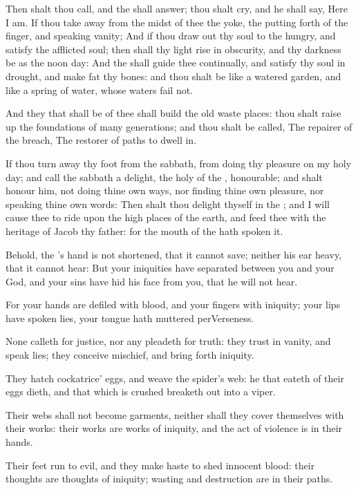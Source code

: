 \Verse Then shalt thou call, and the \LORD shall answer; thou shalt cry, and he shall say, Here I am. If thou take away from the midst of thee the yoke, the putting forth of the finger, and speaking vanity; \Verse And if thou draw out thy soul to the hungry, and satisfy the afflicted soul; then shall thy light rise in obscurity, and thy darkness be as the noon day: \Verse And the \LORD shall guide thee continually, and satisfy thy soul in drought, and make fat thy bones: and thou shalt be like a watered garden, and like a spring of water, whose waters fail not.

\Verse And they that shall be of thee shall build the old waste places: thou shalt raise up the foundations of many generations; and thou shalt be called, The repairer of the breach, The restorer of paths to dwell in.

\Verse If thou turn away thy foot from the sabbath, from doing thy pleasure on my holy day; and call the sabbath a delight, the holy of the \LORD, honourable; and shalt honour him, not doing thine own ways, nor finding thine own pleasure, nor speaking thine own words: \Verse Then shalt thou delight thyself in the \LORD; and I will cause thee to ride upon the high places of the earth, and feed thee with the heritage of Jacob thy father: for the mouth of the \LORD hath spoken it.


\Chapter
\Verse Behold, the \LORD's hand is not shortened, that it cannot save; neither his ear heavy, that it cannot hear: \Verse But your iniquities have separated between you and your God, and your sins have hid his face from you, that he will not hear.

\Verse For your hands are defiled with blood, and your fingers with iniquity; your lips have spoken lies, your tongue hath muttered perVerseness.

\Verse None calleth for justice, nor any pleadeth for truth: they trust in vanity, and speak lies; they conceive mischief, and bring forth iniquity.

\Verse They hatch cockatrice' eggs, and weave the spider's web: he that eateth of their eggs dieth, and that which is crushed breaketh out into a viper.

\Verse Their webs shall not become garments, neither shall they cover themselves with their works: their works are works of iniquity, and the act of violence is in their hands.

\Verse Their feet run to evil, and they make haste to shed innocent blood: their thoughts are thoughts of iniquity; wasting and destruction are in their paths.

